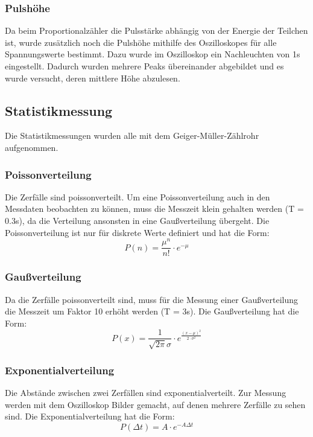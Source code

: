 \documentclass[12pt,a4paper]{article}
\begin{document}
\subsubsection{Pulshöhe}
Da beim Proportionalzähler die Pulsstärke abhängig von der Energie der Teilchen ist, wurde zusätzlich noch die Pulshöhe mithilfe des Oszilloskopes für alle Spannungswerte bestimmt. Dazu wurde im Oszilloskop ein Nachleuchten von 1s eingestellt. Dadurch wurden mehrere Peaks übereinander abgebildet und es wurde versucht, deren mittlere Höhe abzulesen.

\subsection{Statistikmessung}
Die Statistikmessungen wurden alle mit dem Geiger-Müller-Zählrohr aufgenommen.
\subsubsection{Poissonverteilung}
Die Zerfälle sind poissonverteilt. Um eine Poissonverteilung auch in den Messdaten beobachten zu können, muss die Messzeit klein gehalten werden (T = 0.3s), da die Verteilung ansonsten in eine Gaußverteilung übergeht. Die Poissonverteilung ist nur für diskrete Werte definiert und hat die Form:
\begin{equation}
P(n) = \dfrac{\mu ^n}{n!} \cdot e^{-\mu}
\end{equation}
\subsubsection{Gaußverteilung}
Da die Zerfälle poissonverteilt sind, muss für die Messung einer Gaußverteilung die Messzeit um Faktor 10 erhöht werden (T = 3s). Die Gaußverteilung hat die Form:
\begin{equation}
P(x) = \dfrac{1}{\sqrt{2 \pi} \sigma} \cdot e^{\frac{(x - \mu)^2}{2 \cdot \sigma ^2}}
\end{equation}
\subsubsection{Exponentialverteilung}
Die Abstände zwischen zwei Zerfällen sind exponentialverteilt. Zur Messung werden mit dem Oszilloskop Bilder gemacht, auf denen mehrere Zerfälle zu sehen sind. Die Exponentialverteilung hat die Form:
\begin{equation}
P(\Delta t) = A \cdot e^{- A \Delta t}
\end{equation}
\end{document}
